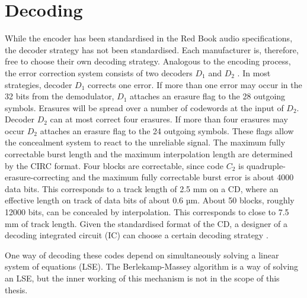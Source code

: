 \documentclass[../main.tex]{subfiles}
\begin{document}
    \section{Decoding}

    While the encoder has been standardised in the Red Book audio specifications, the decoder strategy has not been standardised. Each manufacturer is, therefore, free to choose their own decoding strategy. Analogous to the encoding process, the error correction system consists of two decoders $D_1$ and $D_2$ . In most strategies, decoder $D_1$ corrects one error. If more than one error may occur in the 32 bits from the demodulator, $D_1$ attaches an erasure flag to the 28 outgoing symbols. Erasures will be spread over a number of codewords at the input of $D_2$. Decoder $D_2$ can at most correct four erasures. If more than four erasures may occur $D_2$ attaches an erasure flag to the 24 outgoing symbols. These flags allow the concealment system to react to the unreliable signal. The maximum fully correctable burst length and the maximum interpolation length are determined by the CIRC format. Four blocks are correctable, since code $C_2$ is quadruple-erasure-correcting and the maximum fully correctable burst error is about 4000 data bits. This corresponds to a track length of 2.5 mm on a CD, where an effective length on track of data bits of about 0.6 µm. About 50 blocks, roughly 12000 bits, can be concealed by interpolation. This corresponds to close to 7.5 mm of track length. Given the standardised format of the CD, a designer of a decoding integrated circuit (IC) can choose a certain decoding strategy \autocite{wicker1999reed}.

    One way of decoding these codes depend on simultaneously solving a linear system of equations (LSE). The Berlekamp-Massey algorithm is a way of solving an LSE, but the inner working of this mechanism is not in the scope of this thesis.
\end{document}
